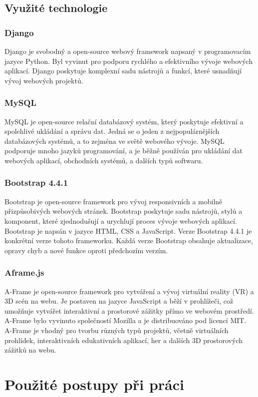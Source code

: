 \documentclass[12pt, a4paper,
oneside,      %
openright
]{report}
\begin{document}
\section[Využité technologie]{Využité technologie}
	\subsection[Django]{Django} 
	Django je svobodný a open-source webový framework napsaný v programovacím jazyce Python. Byl vyvinut pro podporu rychlého a efektivního vývoje webových aplikací. Django poskytuje komplexní sadu nástrojů a funkcí, které usnadňují vývoj webových projektů.
	\subsection[MySQL]{MySQL}  
	MySQL je open-source relační databázový systém, který poskytuje efektivní a spolehlivé ukládání a správu dat. Jedná se o jeden z nejpopulárnějších databázových systémů, a to zejména ve světě webového vývoje. MySQL podporuje mnoho jazyků programování, a je běžně používán pro ukládání dat webových aplikací, obchodních systémů, a dalších typů softwaru.
	\newpage
	\subsection[Bootstrap 4.4.1]{Bootstrap 4.4.1} 
	Bootstrap je open-source framework pro vývoj responsivních a mobilně přizpůsobivých webových stránek. Bootstrap poskytuje sadu nástrojů, stylů a komponent, které zjednodušují a urychlují proces vývoje webových aplikací. Bootstrap je napsán v jazyce HTML, CSS a JavaScript. Verze Bootstrap 4.4.1 je konkrétní verze tohoto frameworku. Každá verze Bootstrap obsahuje aktualizace, opravy chyb a nové funkce oproti předchozím verzím.
	\subsection[Aframe.js]{Aframe.js}
	A-Frame je open-source framework pro vytváření a vývoj virtuální reality (VR) a 3D scén na webu. Je postaven na jazyce JavaScript a běží v prohlížeči, což umožňuje vytvářet interaktivní a prostorové zážitky přímo ve webovém prostředí. A-Frame bylo vyvinuto společností Mozilla a je distribuováno pod licencí MIT.
A-Frame je vhodný pro tvorbu různých typů projektů, včetně virtuálních prohlídek, interaktivních edukativních aplikací, her a dalších 3D prostorových zážitků na webu.
	\chapter{Použité postupy při práci}
\end{document}

